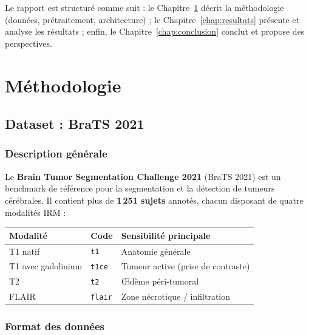 \documentclass[12pt, a4paper]{report}
\begin{document}
Le rapport est structuré comme suit :
le Chapitre~\ref{chap:methodo} décrit la méthodologie (données, prétraitement, architecture) ;
le Chapitre~\ref{chap:resultats} présente et analyse les résultats ;
enfin, le Chapitre~\ref{chap:conclusion} conclut et propose des perspectives.

\chapter{Méthodologie}
\label{chap:methodo}

\section{Dataset : BraTS 2021}

\subsection{Description générale}

Le \textbf{Brain Tumor Segmentation Challenge 2021} (BraTS 2021) est un benchmark de référence
pour la segmentation et la détection de tumeurs cérébrales.
Il contient plus de \textbf{1\,251 sujets} annotés, chacun disposant de quatre modalités IRM :

\begin{center}
\begin{tabular}{@{}lll@{}}
  \toprule
  \textbf{Modalité} & \textbf{Code} & \textbf{Sensibilité principale} \\
  \midrule
  T1 natif          & \texttt{t1}   & Anatomie générale \\
  T1 avec gadolinium& \texttt{t1ce} & Tumeur active (prise de contraste) \\
  T2                & \texttt{t2}   & Œdème péri-tumoral \\
  FLAIR             & \texttt{flair}& Zone nécrotique / infiltration \\
  \bottomrule
\end{tabular}
\end{center}

\subsection{Format des données}
\end{document}

